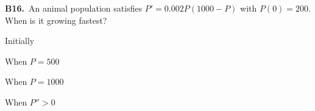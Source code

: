 \documentclass[11pt]{article}
\begin{document}
\bigskip\noindent\textbf{B16.}\ An animal population satisfies $P'=0.002P(1000-P)$ with $P(0)=200$. When is it growing fastest?
\begin{list}{}{\setlength{\leftmargin}{3em}\setlength{\labelwidth}{2.5em}\setlength{\itemsep}{0pt}\setlength{\topsep}{2pt}}
\item[(A)] Initially
\item[(B)] When $P=500$
\item[(C)] When $P=1000$
\item[(D)] When $P''>0$
\end{list}
\end{document}
